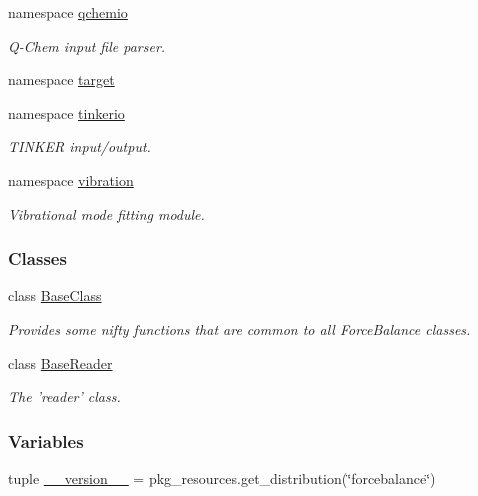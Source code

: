 \begin{DoxyCompactItemize}
\item 
namespace \hyperlink{namespaceforcebalance_1_1qchemio}{qchemio}
\begin{DoxyCompactList}\small\item\em \-Q-\/\-Chem input file parser. \end{DoxyCompactList}\item 
namespace \hyperlink{namespaceforcebalance_1_1target}{target}
\item 
namespace \hyperlink{namespaceforcebalance_1_1tinkerio}{tinkerio}
\begin{DoxyCompactList}\small\item\em \-T\-I\-N\-K\-E\-R input/output. \end{DoxyCompactList}\item 
namespace \hyperlink{namespaceforcebalance_1_1vibration}{vibration}
\begin{DoxyCompactList}\small\item\em \-Vibrational mode fitting module. \end{DoxyCompactList}\end{DoxyCompactItemize}
\subsubsection*{\-Classes}
\begin{DoxyCompactItemize}
\item 
class \hyperlink{classforcebalance_1_1BaseClass}{\-Base\-Class}
\begin{DoxyCompactList}\small\item\em \-Provides some nifty functions that are common to all \-Force\-Balance classes. \end{DoxyCompactList}\item 
class \hyperlink{classforcebalance_1_1BaseReader}{\-Base\-Reader}
\begin{DoxyCompactList}\small\item\em \-The 'reader' class. \end{DoxyCompactList}\end{DoxyCompactItemize}
\subsubsection*{\-Variables}
\begin{DoxyCompactItemize}
\item 
tuple \hyperlink{namespaceforcebalance_a6c10581ea309550b5703fbe56f62e8a2}{\-\_\-\-\_\-version\-\_\-\-\_\-} = pkg\-\_\-resources.\-get\-\_\-distribution(\char`\"{}forcebalance\char`\"{})
\end{DoxyCompactItemize}


